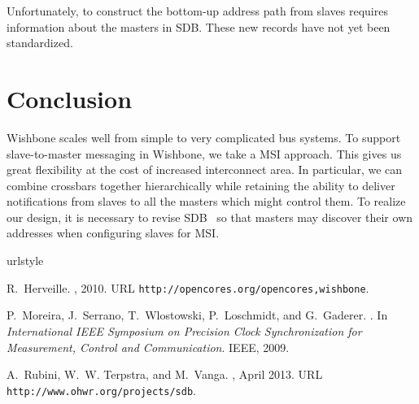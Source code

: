 \documentclass[a4paper]{jacow}
\begin{document}
Unfortunately,
to construct the bottom-up address path from slaves requires information
about the masters in SDB.
These new records have not yet been standardized.

\section{Conclusion}

Wishbone scales well from simple to very complicated bus systems.
To support slave-to-master messaging in Wishbone, we take a MSI approach.
This gives us great flexibility at the cost of increased interconnect area.
In particular, we can combine crossbars together hierarchically 
while retaining the ability to 
deliver notifications from slaves to all the masters which might control them.
To realize our design,
it is necessary to revise SDB~\cite{sdb} so that masters may
discover their own addresses when configuring slaves for MSI.

\begin{thebibliography}{3}
\providecommand{\natexlab}[1]{#1}
\providecommand{\url}[1]{\texttt{#1}}
\expandafter\ifx\csname urlstyle\endcsname\relax
  \providecommand{\doi}[1]{doi: #1}\else
  \providecommand{\doi}{doi: \begingroup \urlstyle{rm}\Url}\fi

R.~Herveille.
, 2010.
\newblock URL \url{http://opencores.org/opencores,wishbone}.

P.~Moreira, J.~Serrano, T.~Wlostowski, P.~Loschmidt, and G.~Gaderer.
.
\newblock In \emph{International IEEE Symposium on Precision Clock
  Synchronization for Measurement, Control and Communication}. IEEE, 2009.

A.~Rubini, W.~W. Terpstra, and M.~Vanga.
, April 2013.
\newblock URL \url{http://www.ohwr.org/projects/sdb}.

\end{thebibliography}
\end{document}
